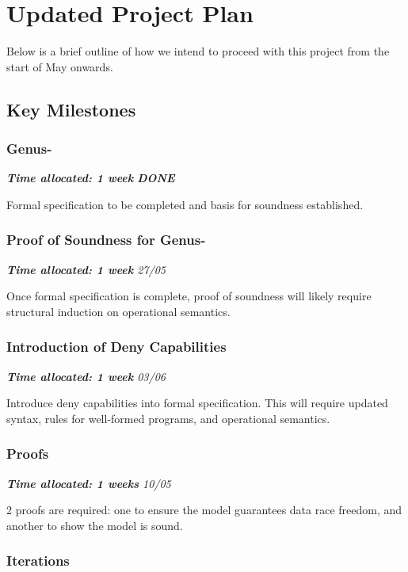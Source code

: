 \chapter{Updated Project Plan}

Below is a brief outline of how we intend to proceed with this project from the start of May onwards.

\section{Key Milestones}

\subsection{Genus-}

\textit{\textbf{Time allocated: 1 week} \hfill \textbf{DONE}}

Formal specification to be completed and basis for soundness established. 

\subsection{Proof of Soundness for Genus-}

\textit{\textbf{Time allocated: 1 week} \hfill 27/05}

Once formal specification is complete, proof of soundness will likely require structural induction on operational semantics.

\subsection{Introduction of Deny Capabilities}

\textit{\textbf{Time allocated: 1 week} \hfill 03/06}

Introduce deny capabilities into formal specification. This will require updated syntax, rules for well-formed programs, and operational semantics.

\subsection{Proofs}

\textit{\textbf{Time allocated: 1 weeks} \hfill 10/05}

2 proofs are required: one to ensure the model guarantees data race freedom, and another to show the model is sound.

\subsection{Iterations}

